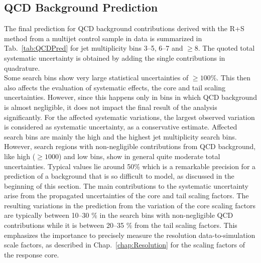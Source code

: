 \subsection{QCD Background Prediction}
\label{subsec:RA2_qcd_pred}
The final prediction for QCD background contributions derived with the R+S method from a multijet control sample in data is summarized in Tab.~\ref{tab:QCDPred} for jet multiplicity bins 3--5, 6--7 and $\ge 8$. The quoted total systematic uncertainty is obtained by adding the single contributions in quadrature. \\
Some search bins show very large statistical uncertainties of $\geq 100 \%$. This then also affects the evaluation of systematic effects, \eg the core and tail scaling uncertainties. However, since this happens only in bins in which QCD background is almost negligible, it does not impact the final result of the analysis significantly. For the affected systematic variations, the largest observed variation is considered as systematic uncertainty, as a conservative estimate. Affected search bins are mainly the high \MHT and the highest jet multiplicity search bins. \\
However, search regions with non-negligible contributions from QCD background, like high \HT ($\ge 1000$\gev) and low \MHT bins, show in general quite moderate total uncertainties. Typical values lie around 50\% which is a remarkable precision for a prediction of a background that is so difficult to model, as discussed in the beginning of this section. The main contributions to the systematic uncertainty arise from the propagated uncertainties of the core and tail scaling factors. The resulting variations in the prediction from the variation of the core scaling factors are typically between 10--30 $\%$ in the search bins with non-negligible QCD contributions while it is between 20--35 $\%$ from the tail scaling factors. This emphasizes the importance to precisely measure the resolution data-to-simulation scale factors, as described in Chap.~\ref{chap:Resolution} for the scaling factors of the response core. 
